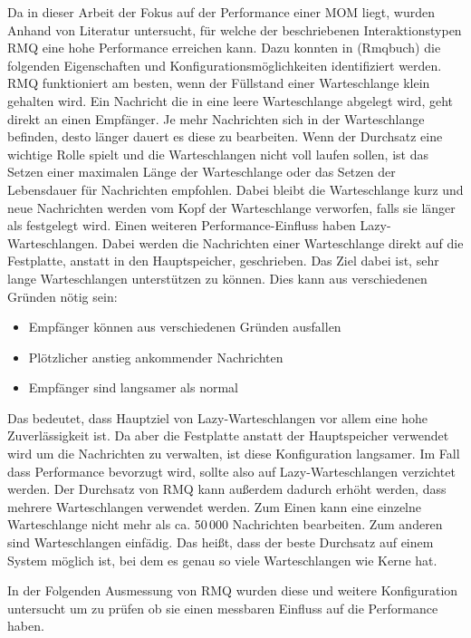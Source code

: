 Da in dieser Arbeit der Fokus auf der Performance einer MOM liegt, wurden Anhand von Literatur untersucht, für welche der beschriebenen Interaktionstypen RMQ eine hohe Performance erreichen kann. Dazu konnten in (Rmqbuch) die folgenden Eigenschaften und Konfigurationsmöglichkeiten identifiziert werden. RMQ funktioniert am besten, wenn der Füllstand einer Warteschlange klein gehalten wird. Ein Nachricht die in eine leere Warteschlange abgelegt wird, geht direkt an einen Empfänger. Je mehr Nachrichten sich in der Warteschlange befinden, desto länger dauert es diese zu bearbeiten. Wenn der Durchsatz eine wichtige Rolle spielt und die Warteschlangen nicht voll laufen sollen, ist das Setzen einer maximalen Länge der Warteschlange oder das Setzen der Lebensdauer für Nachrichten empfohlen. Dabei bleibt die Warteschlange kurz und neue Nachrichten werden vom Kopf der Warteschlange verworfen, falls sie länger als festgelegt wird. Einen weiteren Performance-Einfluss haben Lazy-Warteschlangen. Dabei werden die Nachrichten einer Warteschlange direkt auf die Festplatte, anstatt in den Hauptspeicher, geschrieben. Das Ziel dabei ist, sehr lange Warteschlangen unterstützen zu können. Dies kann aus verschiedenen Gründen nötig sein:
\begin{itemize}
    \item Empfänger können aus verschiedenen Gründen ausfallen
    \item Plötzlicher anstieg ankommender Nachrichten
    \item Empfänger sind langsamer als normal
\end{itemize}
Das bedeutet, dass Hauptziel von Lazy-Warteschlangen vor allem eine hohe Zuverlässigkeit ist. Da aber die Festplatte anstatt der Hauptspeicher verwendet wird um die Nachrichten zu verwalten, ist diese Konfiguration langsamer. Im Fall dass Performance bevorzugt wird, sollte also auf Lazy-Warteschlangen verzichtet werden. Der Durchsatz von RMQ kann außerdem dadurch erhöht werden, dass mehrere Warteschlangen verwendet werden. Zum Einen kann eine einzelne Warteschlange nicht mehr als ca. 50\,000 Nachrichten bearbeiten. Zum anderen sind Warteschlangen einfädig. Das heißt, dass der beste Durchsatz auf einem System möglich ist, bei dem es genau so viele Warteschlangen wie Kerne hat. 

In der Folgenden Ausmessung von RMQ wurden diese und weitere Konfiguration untersucht um zu prüfen ob sie einen messbaren Einfluss auf die Performance haben.

